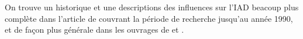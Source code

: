 On trouve un historique et une descriptions des influences sur l'IAD beacoup plus complète dans l'article de \textcite{Bond1988} couvrant la période de recherche jusqu'au année 1990, et de façon plus générale dans les ouvrages de \textcite{Wooldridge2009} et \textcite{Ferber1995}.









